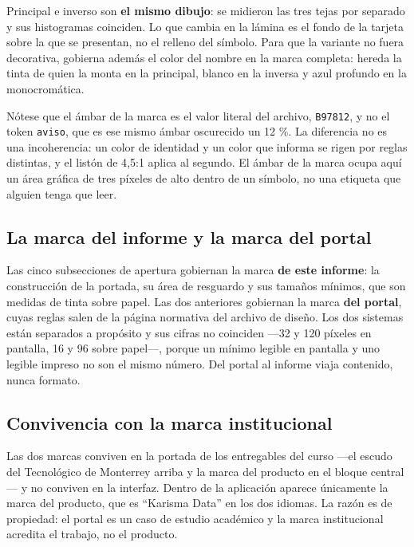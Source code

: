 Principal e inverso son \textbf{el mismo dibujo}: se midieron las tres tejas por separado y sus
histogramas coinciden. Lo que cambia en la lámina es el fondo de la tarjeta sobre la que se
presentan, no el relleno del símbolo. Para que la variante no fuera decorativa, gobierna además el
color del nombre en la marca completa: hereda la tinta de quien la monta en la principal, blanco en
la inversa y azul profundo en la monocromática.

Nótese que el ámbar de la marca es el valor literal del archivo, \texttt{B97812}, y no el token
\texttt{aviso}, que es ese mismo ámbar oscurecido un 12 \%. La diferencia no es una incoherencia:
un color de identidad y un color que informa se rigen por reglas distintas, y el listón de 4{,}5:1
aplica al segundo. El ámbar de la marca ocupa aquí un área gráfica de tres píxeles de alto dentro de
un símbolo, no una etiqueta que alguien tenga que leer.

\subsection{La marca del informe y la marca del portal}

Las cinco subsecciones de apertura gobiernan la marca \textbf{de este informe}: la construcción de
la portada, su área de resguardo y sus tamaños mínimos, que son medidas de tinta sobre papel. Las
dos anteriores gobiernan la marca \textbf{del portal}, cuyas reglas salen de la página normativa
del archivo de diseño. Los dos sistemas están separados a propósito y sus cifras no coinciden ---32
y 120 píxeles en pantalla, 16 y 96 sobre papel---, porque un mínimo legible en pantalla y uno
legible impreso no son el mismo número. Del portal al informe viaja contenido, nunca formato.

\subsection{Convivencia con la marca institucional}

Las dos marcas conviven en la portada de los entregables del curso ---el escudo del Tecnológico de Monterrey arriba y la marca del producto en el bloque central--- y no conviven en la interfaz. Dentro de la aplicación aparece únicamente la marca del producto, que es \enquote{Karisma Data} en los dos idiomas. La razón es de propiedad: el portal es un caso de estudio académico y la marca institucional acredita el trabajo, no el producto.

